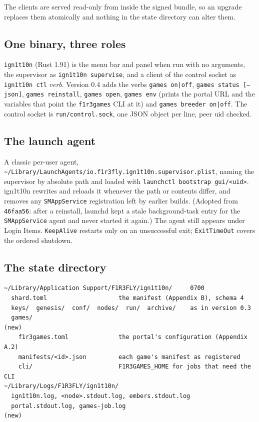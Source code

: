 \documentclass[11pt]{article}
\theoremstyle{definition}
\theoremstyle{remark}
\newcommand{\code}[1]{\texttt{#1}}
\newcommand{\Hr}{ign1t10n}
\begin{document}
\noindent
The clients are served read-only from inside the signed bundle, so an upgrade
replaces them atomically and nothing in the state directory can alter them.

\subsection{One binary, three roles}

\code{ign1t10n} (Rust 1.91) is the menu bar and panel when run with no arguments, the
supervisor as \code{ign1t10n supervise}, and a client of the control socket as
\code{ign1t10n ctl} \textit{verb}. Version 0.4 adds the verbs \code{games on|off},
\code{games status [--json]}, \code{games reinstall}, \code{games open},
\code{games env} (prints the portal URL and the variables that point the
\code{f1r3games} CLI at it) and \code{games breeder on|off}. The control socket is
\code{run/control.sock}, one JSON object per line, peer uid checked.

\subsection{The launch agent}

A classic per-user agent, \code{\textasciitilde/Library/LaunchAgents/io.f1r3fly.ign1t10n.supervisor.plist},
naming the supervisor by absolute path and loaded with
\code{launchctl bootstrap gui/<uid>}. \Hr{} rewrites and reloads it whenever the path
or contents differ, and removes any \code{SMAppService} registration left by earlier
builds. (Adopted from \code{46faa56}: after a reinstall, launchd kept a stale
background-task entry for the \code{SMAppService} agent and never started it again.)
The agent still appears under Login Items. \code{KeepAlive} restarts only on an
unsuccessful exit; \code{ExitTimeOut} covers the ordered shutdown.

\subsection{The state directory}

\begin{lstlisting}
~/Library/Application Support/F1R3FLY/ign1t10n/     0700
  shard.toml                    the manifest (Appendix B), schema 4
  keys/  genesis/  conf/  nodes/  run/  archive/    as in version 0.3
  games/                                                                 (new)
    f1r3games.toml              the portal's configuration (Appendix A.2)
    manifests/<id>.json         each game's manifest as registered
    cli/                        F1R3GAMES_HOME for jobs that need the CLI
~/Library/Logs/F1R3FLY/ign1t10n/
  ign1t10n.log, <node>.stdout.log, embers.stdout.log
  portal.stdout.log, games-job.log                                       (new)
\end{lstlisting}
\end{document}
